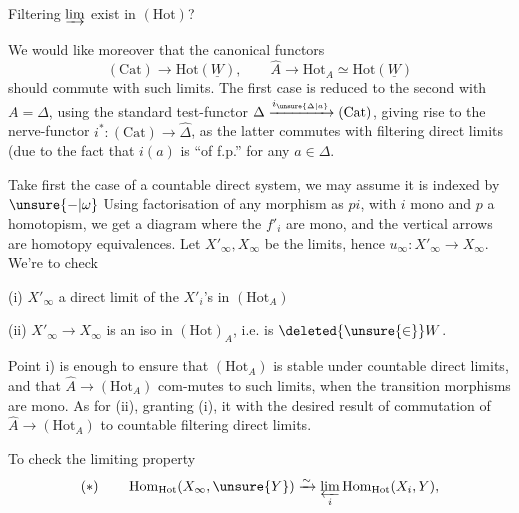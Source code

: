 Filtering $\varinjlim$ exist in $(\mathrm{Hot})$?

We would like moreover that the canonical functors
\[
(\mathrm{Cat})\longrightarrow\mathrm{Hot}(\underline W),\qquad\widehat A\longrightarrow\mathrm{Hot}_A\simeq\mathrm{Hot}(\underline W)
\]
should commute with such limits. The first case is reduced to the second with $A=\Delta$, using the standard test-functor $\Delta\xrightarrow{i_{\unsure{\Delta|a}}}(\mathrm{Cat})$, giving rise to the nerve-functor $i^*:(\mathrm{Cat})\longrightarrow\widehat\Delta$, as the latter commutes with filtering direct limits (due to the fact that $i(a)$ is ``of f.p.'' for any $a\in\Delta$.

Take first the case of a countable direct system, we may assume it is indexed by $\unsure{-|\omega}$
Using factorisation of any morphism as $pi$, with $i$ mono and $p$ a homotopism, we get a diagram
where the $f'_i$ are mono, and the vertical arrows are homotopy equivalences. Let $X'_\infty,X_\infty$ be the limits, hence $u_\infty:X'_\infty\longrightarrow X_\infty$. We're to check

(i) $X'_\infty$  a direct limit of the $X'_i$'s in $(\mathrm{Hot}_A)$

(ii) $X'_\infty\longrightarrow X_\infty$ is an iso in $(\mathrm{Hot})_A$, i.e. is $\deleted{\unsure{\in}}W$.

Point i) is enough  to ensure that $(\mathrm{Hot}_A)$ is stable under countable  direct limits, and that $\widehat A\longrightarrow(\mathrm{Hot}_A)$ com-mutes to such limits, when the transition morphisms are mono.  As for (ii), granting (i), it  with the desired result of commutation of $\widehat A\longrightarrow(\mathrm{Hot}_A)$ to countable filtering direct limits.

To check the limiting property
\[
(*)\qquad\operatorname{Hom}_{\mathrm{Hot}}(X_\infty,\unsure{Y})\xrightarrow{\sim}\varprojlim_i\operatorname{Hom}_{\mathrm{Hot}}(X_i,Y),
\]
